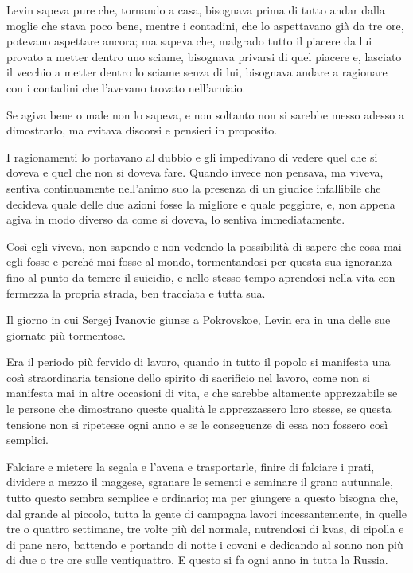 Levin sapeva pure che, tornando a casa, bisognava prima di tutto andar dalla moglie che stava poco bene, mentre i contadini, che lo aspettavano già da tre ore, potevano aspettare ancora; ma sapeva che, malgrado tutto il piacere da lui provato a metter dentro uno sciame, bisognava privarsi di quel piacere e, lasciato il vecchio a metter dentro lo sciame senza di lui, bisognava andare a ragionare con i contadini che l'avevano trovato nell'arniaio. 

Se agiva bene o male non lo sapeva, e non soltanto non si sarebbe messo adesso a dimostrarlo, ma evitava discorsi e pensieri in proposito. 

I ragionamenti lo portavano al dubbio e gli impedivano di vedere quel che si doveva e quel che non si doveva fare. Quando invece non pensava, ma viveva, sentiva continuamente nell'animo suo la presenza di un giudice infallibile che decideva quale delle due azioni fosse la migliore e quale peggiore, e, non appena agiva in modo diverso da come si doveva, lo sentiva immediatamente. 

Così egli viveva, non sapendo e non vedendo la possibilità di sapere che cosa mai egli fosse e perché mai fosse al mondo, tormentandosi per questa sua ignoranza fino al punto da temere il suicidio, e nello stesso tempo aprendosi nella vita con fermezza la propria strada, ben tracciata e tutta sua. 

Il giorno in cui Sergej Ivanovic giunse a Pokrovskoe, Levin era in una delle sue giornate più tormentose. 

Era il periodo più fervido di lavoro, quando in tutto il popolo si manifesta una così straordinaria tensione dello spirito di sacrificio nel lavoro, come non si manifesta mai in altre occasioni di vita, e che sarebbe altamente apprezzabile se le persone che dimostrano queste qualità le apprezzassero loro stesse, se questa tensione non si ripetesse ogni anno e se le conseguenze di essa non fossero così semplici. 

Falciare e mietere la segala e l'avena e trasportarle, finire di falciare i prati, dividere a mezzo il maggese, sgranare le sementi e seminare il grano autunnale, tutto questo sembra semplice e ordinario; ma per giungere a questo bisogna che, dal grande al piccolo, tutta la gente di campagna lavori incessantemente, in quelle tre o quattro settimane, tre volte più del normale, nutrendosi di kvas, di cipolla e di pane nero, battendo e portando di notte i covoni e dedicando al sonno non più di due o tre ore sulle ventiquattro. E questo si fa ogni anno in tutta la Russia. 

